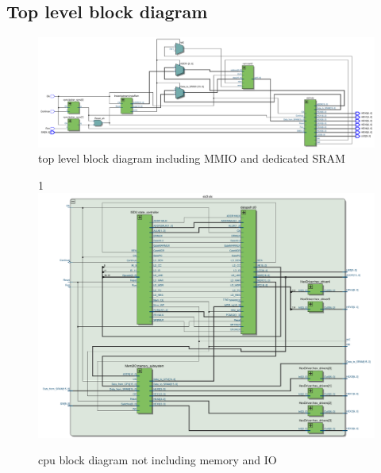 \documentclass[a4paper,12pt]{report}
\begin{document}
\subsection{Top level block diagram} %
\begin{figure}[h]
    \begin{center}
        \includegraphics[scale=.9]{toplevel}
        \caption{top level block diagram including MMIO and dedicated SRAM}
    \end{center}
\end{figure}
\begin{figure}[H]
    \begin{center}
1        \includegraphics[scale=.9]{slc3}
        \caption{cpu block diagram not including memory and IO}
    \end{center}
\end{figure}
\pagebreak
\label{sec: fsm}
\end{document}
